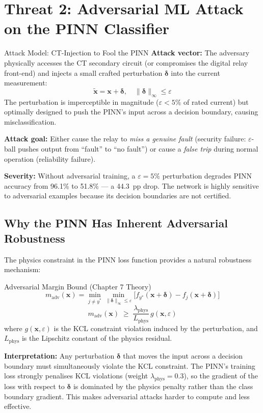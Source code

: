 \documentclass[12pt,a4paper]{article}
\begin{document}
\section{Threat 2: Adversarial ML Attack on the PINN Classifier}

\begin{threatbox}{Attack Model: CT-Injection to Fool the PINN}
\textbf{Attack vector:} The adversary physically accesses the CT secondary circuit (or compromises the digital relay front-end) and injects a small crafted perturbation $\bm{\delta}$ into the current measurement:
\[
  \tilde{\mathbf{x}} = \mathbf{x} + \bm{\delta}, \quad \|\bm{\delta}\|_\infty \leq \varepsilon
\]
The perturbation is imperceptible in magnitude ($\varepsilon < 5\%$ of rated current) but optimally designed to push the PINN's input across a decision boundary, causing misclassification.

\textbf{Attack goal:} Either cause the relay to \textit{miss a genuine fault} (security failure: $\varepsilon$-ball pushes output from ``fault'' to ``no fault'') or cause a \textit{false trip} during normal operation (reliability failure).

\textbf{Severity:} Without adversarial training, a $\varepsilon = 5\%$ perturbation degrades PINN accuracy from 96.1\% to 51.8\% --- a 44.3~pp drop. The network is highly sensitive to adversarial examples because its decision boundaries are not certified.
\end{threatbox}

\subsection{Why the PINN Has Inherent Adversarial Robustness}

The physics constraint in the PINN loss function provides a natural robustness mechanism:

\begin{formulabox}{Adversarial Margin Bound (Chapter 7 Theory)}
\[
  m_\mathrm{adv}(\mathbf{x}) = \min_{j \neq y^*} \min_{\|\bm{\delta}\|_\infty \leq \varepsilon}
    \bigl[f_{y^*}(\mathbf{x}+\bm{\delta}) - f_j(\mathbf{x}+\bm{\delta})\bigr]
\]
\[
  m_\mathrm{adv}(\mathbf{x}) \;\geq\; \frac{\lambda_\mathrm{phys}}{L_\mathrm{phys}}\, g(\mathbf{x}, \varepsilon)
\]
where $g(\mathbf{x}, \varepsilon)$ is the KCL constraint violation induced by the perturbation, and $L_\mathrm{phys}$ is the Lipschitz constant of the physics residual.

\textbf{Interpretation:} Any perturbation $\bm{\delta}$ that moves the input across a decision boundary must simultaneously violate the KCL constraint. The PINN's training loss strongly penalises KCL violations (weight $\lambda_\mathrm{phys} = 0.3$), so the gradient of the loss with respect to $\bm{\delta}$ is dominated by the physics penalty rather than the class boundary gradient. This makes adversarial attacks harder to compute and less effective.
\end{formulabox}
\end{document}
